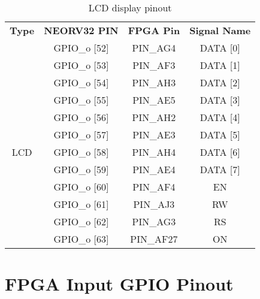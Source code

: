 \begin{table}[!htb]\scriptsize
    \centering
    \begin{tabular}{c c c c}
        \toprule[1.5pt]
        \textbf{Type} & \quad \quad \textbf{NEORV32 PIN} & \quad \quad \textbf{FPGA Pin} & \quad \quad \textbf{Signal Name}  \\
        
               & \quad \quad GPIO\_o [52] & \quad \quad PIN\_AG4  & \quad \quad DATA [0]\\
               & \quad \quad GPIO\_o [53] & \quad \quad PIN\_AF3  & \quad \quad DATA [1]\\
               & \quad \quad GPIO\_o [54] & \quad \quad PIN\_AH3  & \quad \quad DATA [2]\\
               & \quad \quad GPIO\_o [55] & \quad \quad PIN\_AE5  & \quad \quad DATA [3]\\        
               & \quad \quad GPIO\_o [56] & \quad \quad PIN\_AH2  & \quad \quad DATA [4]\\
               & \quad \quad GPIO\_o [57] & \quad \quad PIN\_AE3  & \quad \quad DATA [5]\\
        LCD    & \quad \quad GPIO\_o [58] & \quad \quad PIN\_AH4  & \quad \quad DATA [6]\\  
               & \quad \quad GPIO\_o [59] & \quad \quad PIN\_AE4  & \quad \quad DATA [7]\\ 
               & \quad \quad GPIO\_o [60] & \quad \quad PIN\_AF4  & \quad \quad EN\\
               & \quad \quad GPIO\_o [61] & \quad \quad PIN\_AJ3  & \quad \quad RW\\
               & \quad \quad GPIO\_o [62] & \quad \quad PIN\_AG3  & \quad \quad RS\\
               & \quad \quad GPIO\_o [63] & \quad \quad PIN\_AF27 & \quad \quad ON\\
        \bottomrule[1.5pt]
    \end{tabular}
    \caption{\label{tab:lcd_o}LCD display pinout}
\end{table}


\chapter{FPGA Input GPIO Pinout}

